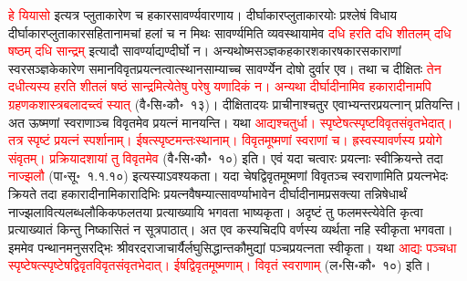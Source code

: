 \begin{sloppypar}
\textcolor{red}{हे यियासो} इत्यत्र प्लुताकारेण च हकार\-सावर्ण्य\-वारणाय। दीर्घाकार\-प्लुताकारयोः प्रश्लेषं विधाय दीर्घाकार\-प्लुताकार\-सहितानामचां हलां च न मिथः सावर्ण्यमिति व्यवस्थायामेव \textcolor{red}{दधि हरति दधि शीतलम् दधि षष्ठम् दधि सान्द्रम्} इत्यादौ सावर्ण्याद्यण्दीर्घो न। अन्यथोष्म\-सञ्ज्ञक\-हकार\-शकार\-षकार\-सकाराणां स्वर\-सञ्ज्ञकेकारेण समान\-विवृत\-प्रयत्नत्वात्स्थान\-साम्याच्च सावर्ण्येन दोषो दुर्वार एव। तथा च दीक्षितः \textcolor{red}{तेन दधीत्यस्य हरति शीतलं षष्ठं सान्द्रमित्येतेषु परेषु यणादिकं न। अन्यथा दीर्घादीनामिव हकारादीनामपि ग्रहणक\-शास्त्र\-बलादच्त्वं स्यात्} (वै॰सि॰कौ॰~१३)। दीक्षितादयः प्राचीनाश्चतुर एवाभ्यन्तर\-प्रयत्नान् प्रतियन्ति। अत ऊष्मणां स्वराणाञ्च विवृतमेव प्रयत्नं मानयन्ति। यथा \textcolor{red}{आद्यश्चतुर्धा। स्पृष्टेषत्स्पृष्ट\-विवृत\-संवृत\-भेदात्। तत्र स्पृष्टं प्रयत्नं स्पर्शानाम्। ईषत्स्पृष्टमन्तःस्थानाम्। विवृतमूष्मणां स्वराणां च। ह्रस्वस्यावर्णस्य प्रयोगे संवृतम्। प्रक्रिया\-दशायां तु विवृतमेव} (वै॰सि॰कौ॰~१०) इति। एवं यदा चत्वारः प्रयत्नाः स्वीक्रियन्ते तदा \textcolor{red}{नाज्झलौ} (पा॰सू॰~१.१.१०) इत्यस्याऽवश्यकता। यदा चेषद्विवृतमूष्मणां विवृतञ्च स्वराणामिति प्रयत्न\-भेदः क्रियते तदा हकारादीनामिकारादिभिः प्रयत्न\-वैषम्यात्सावर्ण्याभावेन दीर्घादीनामप्रसक्त्या तन्निषेधार्थं नाज्झलावित्यलब्ध\-लौकिक\-फलतया प्रत्याख्यायि भगवता भाष्यकृता।
अदृष्टं तु फलमस्त्येवेति कृत्वा प्रत्याख्यातं किन्तु निष्कासितं न सूत्रपाठात्। अत एव कस्यचिदपि वर्णस्य व्यर्थता नहि स्वीकृता भगवता। इममेव पन्थानमनुसरद्भिः श्री\-वरद\-राजाचार्यैर्लघुसिद्धान्त\-कौमुद्यां पञ्च\-प्रयत्नता स्वीकृता। यथा \textcolor{red}{आद्यः पञ्चधा स्पृष्टेषत्स्पृष्टेषद्विवृत\-विवृत\-संवृत\-भेदात्। ईषद्विवृतमूष्मणाम्। विवृतं स्वराणाम्} (ल॰सि॰कौ॰~१०) इति। \end{sloppypar}
